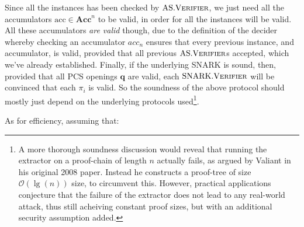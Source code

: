 \documentclass[
]{article}
\newcommand*\Oc{\mathcal{O}}
\renewcommand{\vec}[1]{ \boldsymbol{#1} }
\newcommand*{\acc}{\mathrm{acc}}
\newcommand*{\Verifier}{\mathrm{\text{V\scriptsize ERIFIER}}}
\newcommand*{\SNARKVerifier}{\mathrm{\text{SNARK}}.\Verifier}
\newcommand*{\AS}{\text{AS}}
\newcommand*{\ASVerifier}{\AS.\Verifier}
\newcommand*\Acc{\mathbf{Acc}}
\begin{document}
Since all the instances has been checked by \(\ASVerifier\), we just
need all the accumulators \(\vec{\acc} \in \Acc^n\) to be valid, in
order for all the instances will be valid. All these accumulators
\emph{are valid} though, due to the definition of the decider whereby
checking an accumulator \(acc_n\) ensures that every previous instance,
and accumulator, is valid, provided that all previous \(\ASVerifier\)s
accepted, which we've already established. Finally, if the underlying
SNARK is sound, then, provided that all PCS openings \(\vec{q}\) are
valid, each \(\SNARKVerifier\) will be convinced that each \(\pi_i\) is
valid. So the soundness of the above protocol should mostly just depend
on the underlying protocols used\footnote{A more thorough soundness
  discussion would reveal that running the extractor on a proof-chain of
  length \(n\) actually fails, as argued by Valiant in his original 2008
  paper. Instead he constructs a proof-tree of size \(\Oc(\lg(n))\)
  size, to circumvent this. However, practical applications conjecture
  that the failure of the extractor does not lead to any real-world
  attack, thus still acheiving constant proof sizes, but with an
  additional security assumption added.}.

As for efficiency, assuming that:
\end{document}
